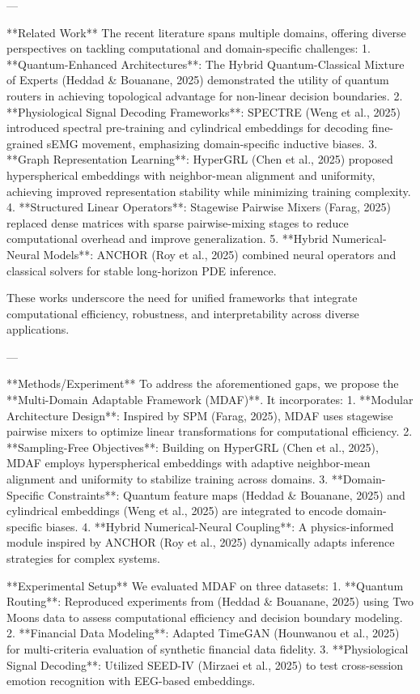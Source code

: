 ---

**Related Work**  
The recent literature spans multiple domains, offering diverse perspectives on tackling computational and domain-specific challenges:  
1. **Quantum-Enhanced Architectures**: The Hybrid Quantum-Classical Mixture of Experts (Heddad & Bouanane, 2025) demonstrated the utility of quantum routers in achieving topological advantage for non-linear decision boundaries.  
2. **Physiological Signal Decoding Frameworks**: SPECTRE (Weng et al., 2025) introduced spectral pre-training and cylindrical embeddings for decoding fine-grained sEMG movement, emphasizing domain-specific inductive biases.  
3. **Graph Representation Learning**: HyperGRL (Chen et al., 2025) proposed hyperspherical embeddings with neighbor-mean alignment and uniformity, achieving improved representation stability while minimizing training complexity.  
4. **Structured Linear Operators**: Stagewise Pairwise Mixers (Farag, 2025) replaced dense matrices with sparse pairwise-mixing stages to reduce computational overhead and improve generalization.  
5. **Hybrid Numerical-Neural Models**: ANCHOR (Roy et al., 2025) combined neural operators and classical solvers for stable long-horizon PDE inference.  

These works underscore the need for unified frameworks that integrate computational efficiency, robustness, and interpretability across diverse applications.  

---

**Methods/Experiment**  
To address the aforementioned gaps, we propose the **Multi-Domain Adaptable Framework (MDAF)**. It incorporates:  
1. **Modular Architecture Design**: Inspired by SPM (Farag, 2025), MDAF uses stagewise pairwise mixers to optimize linear transformations for computational efficiency.  
2. **Sampling-Free Objectives**: Building on HyperGRL (Chen et al., 2025), MDAF employs hyperspherical embeddings with adaptive neighbor-mean alignment and uniformity to stabilize training across domains.  
3. **Domain-Specific Constraints**: Quantum feature maps (Heddad & Bouanane, 2025) and cylindrical embeddings (Weng et al., 2025) are integrated to encode domain-specific biases.  
4. **Hybrid Numerical-Neural Coupling**: A physics-informed module inspired by ANCHOR (Roy et al., 2025) dynamically adapts inference strategies for complex systems.  

**Experimental Setup**  
We evaluated MDAF on three datasets:  
1. **Quantum Routing**: Reproduced experiments from (Heddad & Bouanane, 2025) using Two Moons data to assess computational efficiency and decision boundary modeling.  
2. **Financial Data Modeling**: Adapted TimeGAN (Hounwanou et al., 2025) for multi-criteria evaluation of synthetic financial data fidelity.  
3. **Physiological Signal Decoding**: Utilized SEED-IV (Mirzaei et al., 2025) to test cross-session emotion recognition with EEG-based embeddings.  

